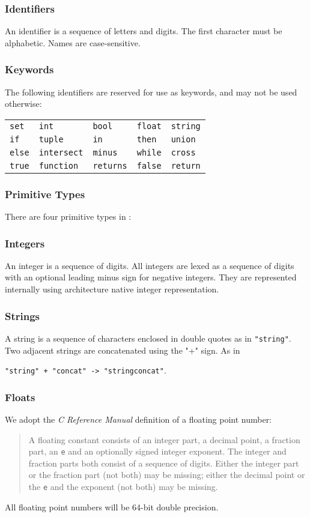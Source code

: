 \subsubsection{Identifiers}
\label{id}
An identifier is a sequence of letters and digits.  The first character must be alphabetic.  Names are case-sensitive.
	
\subsubsection{Keywords}
The following identifiers are reserved for use as keywords, and may not be used otherwise:
	\begin{center}
	\begin{tabular}{lllll}
	\verb|set|\qquad\qquad\qquad &\verb|int| \qquad\qquad\qquad &\verb|bool| \qquad\qquad\qquad &	\verb|float| \qquad\qquad\qquad &\verb|string| \\
	\verb|if| &\verb|tuple| &\verb|in| &\verb|then| &\verb|union|\\
	\verb|else| &\verb|intersect| &\verb|minus| &\verb|while| &\verb|cross|\\
	\verb|true| &\verb|function| &\verb|returns| &\verb|false| &\verb|return|
	\end{tabular}
	\end{center}

\subsubsection{Primitive Types}
	There are four primitive types in \lang:  	
		\subsubsection{Integers}
		An integer is a sequence of digits.  All integers are lexed as a sequence of digits with an optional leading minus sign for negative integers.  They are represented internally using architecture native integer representation.
		\subsubsection{Strings}
		A string is a sequence of characters enclosed in double quotes as in \verb|"string"|.  Two adjacent strings are concatenated using the "+" sign.  As in
		\begin{center}
		\verb|"string" + "concat" -> "stringconcat"|.
		\end{center}
		\subsubsection{Floats}
		We adopt the \textit{C Reference Manual} definition of a floating point number:
		\begin{quotation}
		A floating constant consists of an integer part, a decimal point, a fraction part, an \verb|e| and an optionally signed integer exponent.  The integer and fraction parts both consist of a sequence of digits.  Either the integer part or the fraction part (not both) may be missing; either the decimal point or the \verb|e| and the exponent (not both) may be missing.
		\end{quotation}		
		All floating point numbers will be 64-bit double precision.
